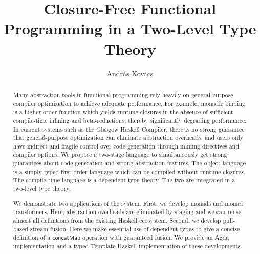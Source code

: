 \documentclass[acmsmall,screen]{acmart}
\theoremstyle{remark}
\begin{document}
\title{Closure-Free Functional Programming in a Two-Level Type Theory}


\author{András Kovács}


\begin{abstract}
Many abstraction tools in functional programming rely heavily on general-purpose
compiler optimization to achieve adequate performance. For example, monadic
binding is a higher-order function which yields runtime closures in the absence
of sufficient compile-time inlining and beta-reductions, thereby significantly
degrading performance. In current systems such as the Glasgow Haskell Compiler,
there is no strong guarantee that general-purpose optimization can eliminate
abstraction overheads, and users only have indirect and fragile control over
code generation through inlining directives and compiler options. We propose a
two-stage language to simultaneously get strong guarantees about code generation
and strong abstraction features. The object language is a simply-typed
first-order language which can be compiled without runtime closures. The
compile-time language is a dependent type theory. The two are integrated in a
two-level type theory.

We demonstrate two applications of the system. First, we develop monads and
monad transformers. Here, abstraction overheads are eliminated by staging and we
can reuse almost all definitions from the existing Haskell ecosystem. Second,
we develop pull-based stream fusion. Here we make essential use of dependent
types to give a concise definition of a $\mathsf{concatMap}$ operation with
guaranteed fusion. We provide an Agda implementation and a typed Template
Haskell implementation of these developments.

\end{abstract}
\end{document}
